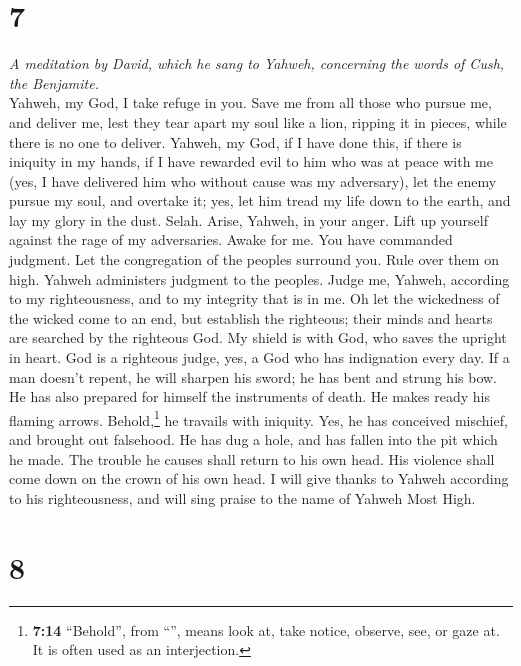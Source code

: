 \hypertarget{section-6}{%
\section{7}\label{section-6}}

\emph{A meditation by David, which he sang to Yahweh, concerning the
words of Cush, the Benjamite.}\\
 Yahweh, my God, I take refuge in you. Save me from all
those who pursue me, and deliver me,  lest they tear apart
my soul like a lion, ripping it in pieces, while there is no one to
deliver.  Yahweh, my God, if I have done this, if there is
iniquity in my hands,  if I have rewarded evil to him who
was at peace with me (yes, I have delivered him who without cause was my
adversary),  let the enemy pursue my soul, and overtake
it; yes, let him tread my life down to the earth, and lay my glory in
the dust. Selah.  Arise, Yahweh, in your anger. Lift up
yourself against the rage of my adversaries. Awake for me. You have
commanded judgment.  Let the congregation of the peoples
surround you. Rule over them on high.  Yahweh administers
judgment to the peoples. Judge me, Yahweh, according to my
righteousness, and to my integrity that is in me.  Oh let
the wickedness of the wicked come to an end, but establish the
righteous; their minds and hearts are searched by the righteous God.
 My shield is with God, who saves the upright in heart.
 God is a righteous judge, yes, a God who has indignation
every day.  If a man doesn't repent, he will sharpen his
sword; he has bent and strung his bow.  He has also
prepared for himself the instruments of death. He makes ready his
flaming arrows.  Behold,\footnote{\textbf{7:14}
  ``Behold'', from ``'', means look at, take notice,
  observe, see, or gaze at. It is often used as an interjection.} he
travails with iniquity. Yes, he has conceived mischief, and brought out
falsehood.  He has dug a hole, and has fallen into the
pit which he made.  The trouble he causes shall return to
his own head. His violence shall come down on the crown of his own head.
 I will give thanks to Yahweh according to his
righteousness, and will sing praise to the name of Yahweh Most High.

\hypertarget{section-7}{%
\section{8}\label{section-7}}

